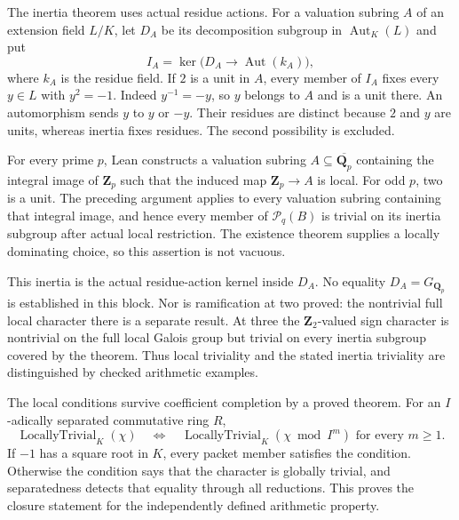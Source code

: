 \documentclass[11pt]{article}
\theoremstyle{definition}
\theoremstyle{remark}
\newcommand{\Z}{\mathbf Z}
\newcommand{\Q}{\mathbf Q}
\begin{document}
The inertia theorem uses actual residue actions. For a valuation subring
$A$ of an extension field $L/K$, let $D_A$ be its decomposition subgroup
in $\operatorname{Aut}_K(L)$ and put
\[
I_A=\ker\bigl(D_A\longrightarrow\operatorname{Aut}(k_A)\bigr),
\]
where $k_A$ is the residue field. If $2$ is a unit in $A$, every member
of $I_A$ fixes every $y\in L$ with $y^2=-1$. Indeed $y^{-1}=-y$, so
$y$ belongs to $A$ and is a unit there. An automorphism sends $y$ to
$y$ or $-y$. Their residues are distinct because $2$ and $y$ are units,
whereas inertia fixes residues. The second possibility is excluded.

For every prime $p$, Lean constructs a valuation subring
$A\subseteq\overline{\Q_p}$ containing the integral image of $\Z_p$
such that the induced map $\Z_p\to A$ is local. For odd $p$, two is
a unit. The preceding argument applies to every valuation subring
containing that integral image, and hence every member of
$\mathcal P_q(B)$ is trivial on its inertia subgroup after actual local
restriction. The existence theorem supplies a locally dominating choice,
so this assertion is not vacuous.

This inertia is the actual residue-action kernel inside $D_A$. No equality
$D_A=G_{\Q_p}$ is established in this block. Nor is ramification at two
proved: the nontrivial full local character there is a separate result.
At three the $\Z_2$-valued sign character is nontrivial on the full local
Galois group but trivial on every inertia subgroup covered by the theorem.
Thus local triviality and the stated inertia triviality are distinguished
by checked arithmetic examples.

The local conditions survive coefficient completion by a proved theorem.
For an $I$-adically separated commutative ring $R$,
\[
\operatorname{LocallyTrivial}_K(\chi)
\quad\Longleftrightarrow\quad
\operatorname{LocallyTrivial}_K(\chi\bmod I^m)
\text{ for every }m\ge1.
\]
If $-1$ has a square root in $K$, every packet member satisfies the
condition. Otherwise the condition says that the character is globally
trivial, and separatedness detects that equality through all reductions.
This proves the closure statement for the independently defined arithmetic
property.
\end{document}
